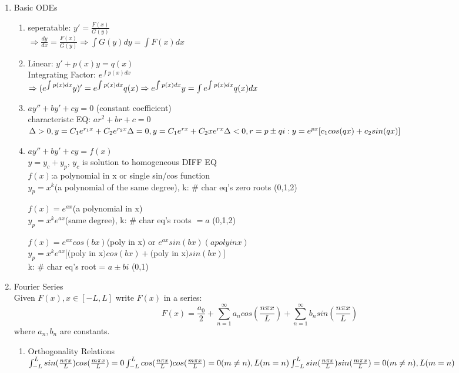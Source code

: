 \documentclass[10pt]{article}
\begin{document}
  
\begin{multicols}{2}
	
\begin{enumerate}
	\item Basic ODEs
	\begin{enumerate}
		\item seperatable: $y'= \frac{F(x)}{G(y)}$\\
		$\Rightarrow \frac{dy}{dx} = \frac{F(x)}{G(y)} \Rightarrow \int G(y)dy = \int F(x)dx$
		
		\item Linear: $y'+p(x)y = q(x)$\\
		Integrating Factor: $e^{\int p(x)dx}$\\
		$\Rightarrow (e^{\int p(x)dx}y)' = e^{\int p(x)dx}q(x)\\ \Rightarrow
		e^{\int p(x)dx}y = \int e^{\int p(x)dx}q(x)dx$
		
		\item $ay'' + by' + cy = 0$ (constant coefficient)\\
		characteristc EQ: $ar^2 + br + c = 0$\\
		$\Delta > 0, y = C_1e^{r_1x} + C_2e^{r_2x}\\
		\Delta = 0, y = C_1e^{rx} + C_2xe^{rx}\\
		\Delta < 0, r = p \pm qi: y = e^{px}[c_1cos(qx)+c_2sin(qx)]$
		
		\item $ay'' + by' + cy = f(x)$ \\
		$y = y_c + y_p$, $y_c$ is solution to homogeneous DIFF EQ\\
		$f(x)$:a polynomial in x or single sin/cos function\\
		$y_p =  x^k$(a polynomial of the same degree), k: $\#$ char eq's zero roots (0,1,2)
		
		$f(x) = e^{ax}$(a polynomial in x)\\
		$y_p =  x^ke^{ax}$(same degree), k: $\#$ char eq's roots $= a$ (0,1,2)
		
		$f(x) = e^{ax}cos(bx)$(poly in x) or $e^{ax}sin(bx)(a poly in x)$\\
		$y_p = x^ke^{ax} [ ($poly in x$)cos(bx) + ($poly in x$)sin(bx) ]$\\
		k: $\#$ char eq's root = $a \pm bi$ (0,1)
	\end{enumerate}

	\item Fourier Series\\
	Given $F(x), x\in [-L,L]$ write $F(x)$ in a series:
	$$F(x) = \frac{a_0}{2} + \sum_{n = 1}^{\infty}a_n cos(\frac{n\pi x}{L}) + \sum_{n = 1}^{\infty}b_n sin(\frac{n\pi x}{L})$$ where $a_n, b_n$ are constants.
	\begin{enumerate}
		\item  Orthogonality Relations\\
		$\int_{-L}^{L}sin(\frac{n\pi x}{L})cos(\frac{m\pi x}{L}) = 0\\
		\int_{-L}^{L}cos(\frac{n\pi x}{L})cos(\frac{m\pi x}{L}) = 0(m \neq n), L(m = n)\\
		\int_{-L}^{L}sin(\frac{n\pi x}{L})sin(\frac{m\pi x}{L}) = 0(m \neq n), L(m = n)$
		

\end{enumerate}
\end{enumerate}
\end{multicols}
\end{document}
